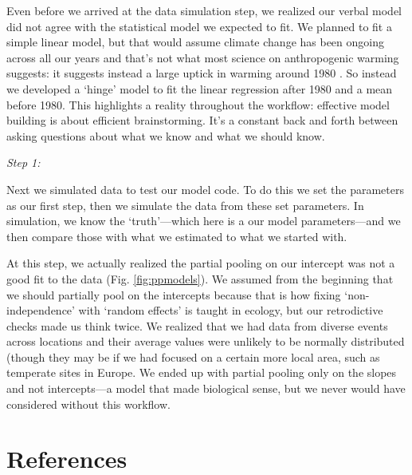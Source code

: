 \documentclass[11pt]{article}
\begin{document}
Even before we arrived at the data simulation step, we realized our verbal model did not agree with the statistical model we expected to fit. We planned to fit a simple linear model, but that would assume climate change has been ongoing across all our years and that's not what most science on anthropogenic warming suggests: it suggests instead a large uptick in warming around 1980 \citep[likely do to effects of aerosols,][]{Booth2012}. So instead we developed a `hinge' model to fit the linear regression after 1980 and a mean before 1980. This highlights a reality throughout the workflow: effective model building is about efficient brainstorming. It's a constant back and forth between asking questions about what we know and what we should know. 

\emph{Step 1:}
 
Next we simulated data to test our model code. To do this we set the parameters as our first step, then we simulate the data  from these set parameters. In simulation, we know the `truth'---which here is a our model parameters---and we then compare those with what we estimated to what we started with.
 

At this step, we actually realized the partial pooling on our intercept was not a good fit to the data (Fig. \ref{fig:ppmodels}). We assumed from the beginning that we should partially pool on the intercepts because that is how fixing `non-independence' with `random effects' is taught in ecology, but our retrodictive checks made us think twice. We realized that we had data from diverse events across locations and their average values were unlikely to be normally distributed (though they may be if we had focused on a certain more local area, such as temperate sites in Europe. We ended up with partial pooling only on the slopes and not intercepts---a model that made biological sense, but we never would have considered without this workflow. 


\section{References}
\vspace{-5ex}

\end{document}
